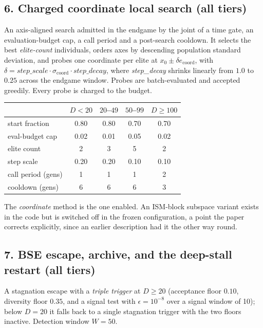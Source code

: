 \documentclass[11pt,a4paper]{article}
\begin{document}
\subsection{6. Charged coordinate local search (all tiers)}

An axis-aligned search admitted in the endgame by the joint of a time gate, an
evaluation-budget cap, a call period and a post-search cooldown. It selects the
best \textit{elite-count} individuals, orders axes by descending population
standard deviation, and probes one coordinate per elite at
$x_0 \pm \delta e_{\mathrm{coord}}$, with
$\delta = \mathit{step\_scale} \cdot \sigma_{\mathrm{coord}} \cdot
\mathit{step\_decay}$, where \textit{step\_decay} shrinks linearly from $1.0$
to $0.25$ across the endgame window. Probes are batch-evaluated and accepted
greedily. Every probe is charged to the budget.

\begin{center}
\small
\begin{tabular}{@{}lcccc@{}}
\toprule
& $D{<}20$ & $20$--$49$ & $50$--$99$ & $D{\geq}100$\\
\midrule
start fraction & 0.80 & 0.80 & 0.70 & 0.70\\
eval-budget cap & 0.02 & 0.01 & 0.05 & 0.02\\
elite count & 2 & 3 & 5 & 2\\
step scale & 0.20 & 0.20 & 0.10 & 0.10\\
call period (gens) & 1 & 1 & 1 & 2\\
cooldown (gens) & 6 & 6 & 6 & 3\\
\bottomrule
\end{tabular}
\end{center}

The \emph{coordinate} method is the one enabled. An ISM-block subspace variant
exists in the code but is switched off in the frozen configuration, a point
the paper corrects explicitly, since an earlier description had it the other
way round.

\subsection{7. BSE escape, archive, and the deep-stall restart (all tiers)}

A stagnation escape with a \emph{triple trigger} at $D\geq20$ (acceptance floor
$0.10$, diversity floor $0.35$, and a signal test with $\epsilon = 10^{-8}$
over a signal window of 10); below $D=20$ it falls back to a single stagnation
trigger with the two floors inactive. Detection window $W = 50$.
\end{document}
